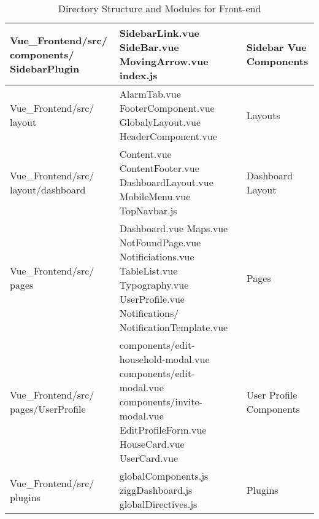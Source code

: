 \documentclass[conference]{IEEEtran}
\begin{document}
\begin{table}[H]
\begin{tabular}{|m{2.6cm}|m{3.5cm}|m{1.6cm}|}
Vue\_Frontend/src/ components/ SidebarPlugin & 
SidebarLink.vue \newline
SideBar.vue \newline
MovingArrow.vue \newline
index.js & 
Sidebar Vue Components \\ \hline

Vue\_Frontend/src/ layout & 
AlarmTab.vue \newline
FooterComponent.vue \newline
GlobalyLayout.vue \newline
HeaderComponent.vue & 
Layouts \\ \hline

Vue\_Frontend/src/ layout/dashboard & 
Content.vue \newline
ContentFooter.vue \newline
DashboardLayout.vue \newline
MobileMenu.vue \newline
TopNavbar.js & 
Dashboard Layout \\ \hline

Vue\_Frontend/src/ pages & 
Dashboard.vue \newline
Maps.vue \newline
NotFoundPage.vue \newline
Notificiations.vue \newline
TableList.vue \newline
Typography.vue \newline
UserProfile.vue  \newline
Notifications/ NotificationTemplate.vue &
Pages \\ \hline

Vue\_Frontend/src/ pages/UserProfile & 
components/edit-household-modal.vue \newline
components/edit-modal.vue \newline
components/invite-modal.vue \newline
EditProfileForm.vue \newline
HouseCard.vue \newline
UserCard.vue & 
User Profile Components \\ \hline

Vue\_Frontend/src/ plugins & 
globalComponents.js \newline
ziggDashboard.js \newline
globalDirectives.js & 
Plugins \\ \hline

\end{tabular}
\caption{Directory Structure and Modules for Front-end}
\end{table}
\end{document}
